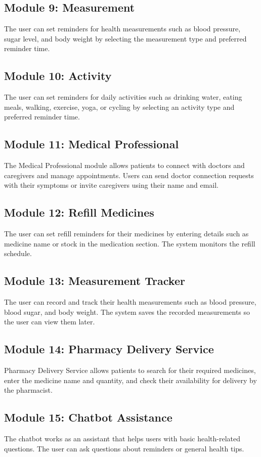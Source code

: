 \subsection{Module 9: Measurement}
The user can set reminders for health measurements such as blood pressure, sugar level, and body weight by selecting the measurement type and preferred reminder time.

\subsection{Module 10: Activity}
The user can set reminders for daily activities such as drinking water, eating meals, walking, exercise, yoga, or cycling by selecting an activity type and preferred reminder time.

\subsection{Module 11: Medical Professional}
The Medical Professional module allows patients to connect with doctors and caregivers and manage appointments. Users can send doctor connection requests with their symptoms or invite caregivers using their name and email.

\subsection{Module 12: Refill Medicines}
The user can set refill reminders for their medicines by entering details such as medicine name or stock in the medication section. The system monitors the refill schedule.

\subsection{Module 13: Measurement Tracker}
The user can record and track their health measurements such as blood pressure, blood sugar, and body weight. The system saves the recorded measurements so the user can view them later.

\subsection{Module 14: Pharmacy Delivery Service}
Pharmacy Delivery Service allows patients to search for their required medicines, enter the medicine name and quantity, and check their availability for delivery by the pharmacist.

\subsection{Module 15: Chatbot Assistance}
The chatbot works as an assistant that helps users with basic health-related questions. The user can ask questions about reminders or general health tips.

